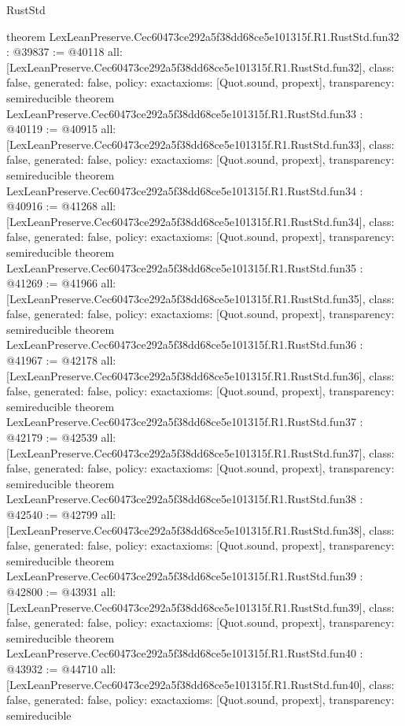 \begin{lexlean}{RustStd}
\begin{coremodule}
{}
theorem LexLeanPreserve.Cec60473ce292a5f38dd68ce5e101315f.R1.RustStd.fun32 : @39837 := @40118 {
  all: [LexLeanPreserve.Cec60473ce292a5f38dd68ce5e101315f.R1.RustStd.fun32],
  class: false,
  generated: false,
  policy: exact{axioms: [Quot.sound, propext]},
  transparency: semireducible
}
theorem LexLeanPreserve.Cec60473ce292a5f38dd68ce5e101315f.R1.RustStd.fun33 : @40119 := @40915 {
  all: [LexLeanPreserve.Cec60473ce292a5f38dd68ce5e101315f.R1.RustStd.fun33],
  class: false,
  generated: false,
  policy: exact{axioms: [Quot.sound, propext]},
  transparency: semireducible
}
theorem LexLeanPreserve.Cec60473ce292a5f38dd68ce5e101315f.R1.RustStd.fun34 : @40916 := @41268 {
  all: [LexLeanPreserve.Cec60473ce292a5f38dd68ce5e101315f.R1.RustStd.fun34],
  class: false,
  generated: false,
  policy: exact{axioms: [Quot.sound, propext]},
  transparency: semireducible
}
theorem LexLeanPreserve.Cec60473ce292a5f38dd68ce5e101315f.R1.RustStd.fun35 : @41269 := @41966 {
  all: [LexLeanPreserve.Cec60473ce292a5f38dd68ce5e101315f.R1.RustStd.fun35],
  class: false,
  generated: false,
  policy: exact{axioms: [Quot.sound, propext]},
  transparency: semireducible
}
theorem LexLeanPreserve.Cec60473ce292a5f38dd68ce5e101315f.R1.RustStd.fun36 : @41967 := @42178 {
  all: [LexLeanPreserve.Cec60473ce292a5f38dd68ce5e101315f.R1.RustStd.fun36],
  class: false,
  generated: false,
  policy: exact{axioms: [Quot.sound, propext]},
  transparency: semireducible
}
theorem LexLeanPreserve.Cec60473ce292a5f38dd68ce5e101315f.R1.RustStd.fun37 : @42179 := @42539 {
  all: [LexLeanPreserve.Cec60473ce292a5f38dd68ce5e101315f.R1.RustStd.fun37],
  class: false,
  generated: false,
  policy: exact{axioms: [Quot.sound, propext]},
  transparency: semireducible
}
theorem LexLeanPreserve.Cec60473ce292a5f38dd68ce5e101315f.R1.RustStd.fun38 : @42540 := @42799 {
  all: [LexLeanPreserve.Cec60473ce292a5f38dd68ce5e101315f.R1.RustStd.fun38],
  class: false,
  generated: false,
  policy: exact{axioms: [Quot.sound, propext]},
  transparency: semireducible
}
theorem LexLeanPreserve.Cec60473ce292a5f38dd68ce5e101315f.R1.RustStd.fun39 : @42800 := @43931 {
  all: [LexLeanPreserve.Cec60473ce292a5f38dd68ce5e101315f.R1.RustStd.fun39],
  class: false,
  generated: false,
  policy: exact{axioms: [Quot.sound, propext]},
  transparency: semireducible
}
theorem LexLeanPreserve.Cec60473ce292a5f38dd68ce5e101315f.R1.RustStd.fun40 : @43932 := @44710 {
  all: [LexLeanPreserve.Cec60473ce292a5f38dd68ce5e101315f.R1.RustStd.fun40],
  class: false,
  generated: false,
  policy: exact{axioms: [Quot.sound, propext]},
  transparency: semireducible
}
\end{coremodule}
\end{lexlean}
